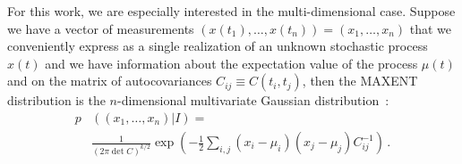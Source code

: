 \documentclass{aa}
\begin{document}
For this work, we are especially interested in the multi-dimensional case. Suppose we have a vector of measurements $(x(t_1),\ldots,x(t_n)) = (x_1, \ldots, x_n)$ that we conveniently express as a single realization of an unknown stochastic process $x(t)$ and we have information about the expectation value of the process $\mu(t)$ and on the matrix of autocovariances $C_{ij} \equiv C(t_i,t_j)$, then the MAXENT distribution is the $n$-dimensional multivariate Gaussian distribution~\citep{gregory_2005}: 
\begin{align}
    p&\left((x_1, \ldots, x_n)\vert I\right) = \nonumber \\
    &\frac{1}{\left(2 \pi \det C\right)^{k / 2}}\exp\left(-\frac{1}{2}\sum_{i,j}(x_i-\mu_i) (x_j-\mu_j)C^{-1}_{ij} \right)\,. 
\end{align}
\end{document}
